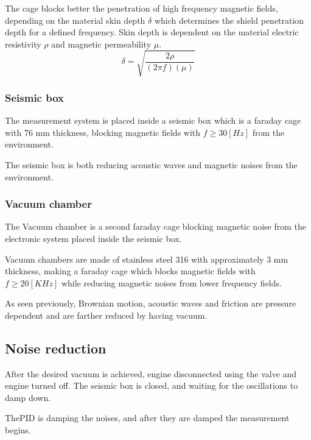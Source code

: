 \documentclass[\main/master.tex]{subfiles}
\begin{document}
\par\noindent
The cage blocks better the penetration of high frequency magnetic fields, depending on the material skin depth $\delta$ which determines the shield penetration depth for a defined frequency. Skin depth is dependent on the material electric resistivity $\rho$ and magnetic permeability $\mu$. 
\begin{equation}
\delta = \sqrt{\frac{2\rho}{(2\pi f)(\mu)} }    \label{eqn:skin depth}
\end{equation}

\subsubsection{Seismic box}
The measurement system is placed inside a seismic box which is a faraday cage with 76 mm thickness, blocking magnetic fields with $f \ge 30 [Hz]$ from the environment.
\par\noindent
The seismic box is both reducing acoustic waves and magnetic noises from the environment.
\subsubsection{Vacuum chamber}
The Vacuum chamber is a second faraday cage blocking magnetic noise from the electronic system placed inside the seismic box.
\par\noindent
Vacuum chambers are made of stainless steel 316 with approximately 3 mm thickness, making a faraday cage which blocks magnetic fields with $f\ge 20 [KHz]$ while reducing magnetic noises from lower frequency fields.
\par\noindent
As seen previously, Brownian motion, acoustic waves and friction are pressure dependent and are farther reduced by having vacuum.

\subsection{Noise reduction}
\par\noindent
After the desired vacuum is achieved, engine disconnected using the valve and engine turned off. The seismic box is closed, and waiting for the oscillations to damp down.


\par\noindent
ThePID is damping the noises, and after they are damped the measurement begins.
\end{document}
